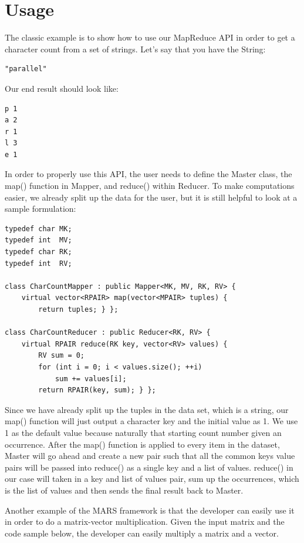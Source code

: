 \documentclass[11pt]{article}
\begin{document}
\section{Usage}
The classic example is to show how to use our MapReduce API in order to get a character count from a set of strings. Let's say that you have the String:
\begin{verbatim}
"parallel"
\end{verbatim}
Our end result should look like:
\begin{verbatim}
p 1
a 2
r 1
l 3
e 1
\end{verbatim}
In order to properly use this API, the user needs to define the Master class, the map() function in Mapper, and reduce() within Reducer. To make computations easier, we already split up the data for the user, but it is still helpful to look at a sample formulation:
\begin{verbatim}
typedef char MK;
typedef int  MV;
typedef char RK;
typedef int  RV;

class CharCountMapper : public Mapper<MK, MV, RK, RV> {
    virtual vector<RPAIR> map(vector<MPAIR> tuples) {
        return tuples; } };

class CharCountReducer : public Reducer<RK, RV> {
    virtual RPAIR reduce(RK key, vector<RV> values) {
        RV sum = 0;
        for (int i = 0; i < values.size(); ++i)
            sum += values[i];
        return RPAIR(key, sum); } };
\end{verbatim}
Since we have already split up the tuples in the data set, which is a string, our map() function will just output a character key and the initial value as 1. We use 1 as the default value because naturally that starting count number given an occurrence. After the map() function is applied to every item in the dataset, Master will go ahead and create a new pair such that all the common keys value pairs will be passed into reduce() as a single key and a list of values. reduce() in our case will taken in a key and list of values pair, sum up the occurrences, which is the list of values and then sends the final result back to Master.

Another example of the MARS framework is that the developer can easily use it in order to do a matrix-vector multiplication. Given the input matrix and the code sample below, the developer can easily multiply a matrix and a vector.
\end{document}
